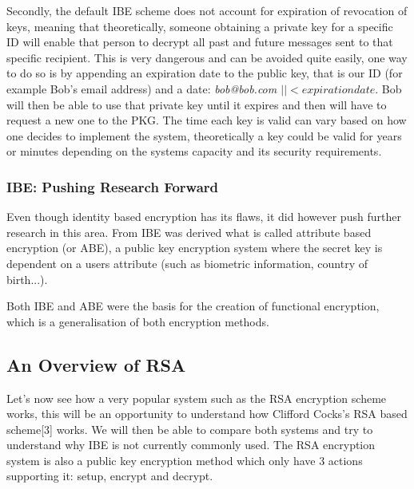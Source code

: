 \documentclass[conference]{IEEEtran}
\begin{document}
Secondly, the default IBE scheme does not account for expiration of revocation of keys,
meaning that theoretically, someone obtaining a private key for a specific ID will enable 
that person to decrypt all past and future messages sent to that specific recipient.
This is very dangerous and can be avoided quite easily, one way to do so is by appending an 
expiration date to the public key, that is our ID (for example Bob's email address) and a date:
\textit{bob@bob.com $\mid \mid <expiration date$}. Bob will then be able to use that private key until 
it expires and then will have to request a new one to the PKG. The time each key is valid can 
vary based on how one decides to implement the system, theoretically a key could 
be valid for years or minutes depending on the systems capacity and its security requirements.

\subsubsection{IBE: Pushing Research Forward}
Even though identity based encryption has its flaws, it did however 
push further research in this area. From IBE was derived what is called
attribute based encryption (or ABE), a public key encryption system where the secret key is dependent 
on a users attribute (such as biometric information, country of birth...).

Both IBE and ABE were the basis for the creation of functional encryption, 
which is a generalisation of both encryption methods.


\subsection{An Overview of RSA}
Let's now see how a very popular system such as the RSA encryption scheme works, 
this will be an opportunity to understand how Clifford Cocks's RSA based scheme[3] works.
We will then be able to compare both systems and try to understand why 
IBE is not currently commonly used.
The RSA encryption system is also a public key encryption method 
which only have 3 actions supporting it: setup, encrypt and decrypt.
\end{document}
